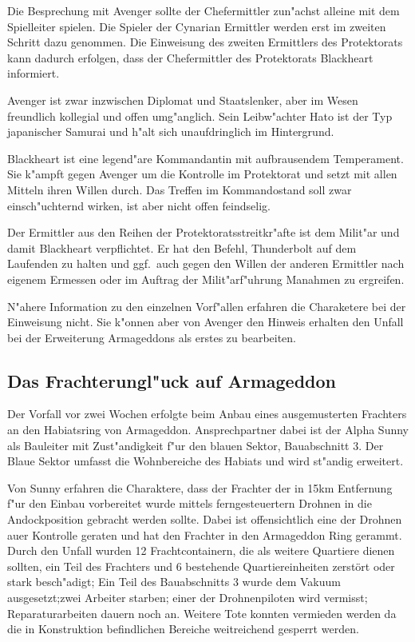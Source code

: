 \begin{remarks}
	Die Besprechung mit Avenger sollte der Chefermittler zun"achst alleine mit dem Spielleiter spielen. Die Spieler der Cynarian Ermittler werden erst im zweiten Schritt dazu genommen. Die Einweisung des zweiten Ermittlers des Protektorats kann dadurch erfolgen, dass der Chefermittler des Protektorats Blackheart informiert.
	
	Avenger ist zwar inzwischen Diplomat und Staatslenker, aber im Wesen freundlich kollegial und offen umg"anglich. Sein Leibw"achter Hato ist der Typ japanischer Samurai und h"alt sich unaufdringlich im Hintergrund.
	
	Blackheart ist eine legend"are Kommandantin mit aufbrausendem Temperament. Sie k"ampft gegen Avenger um die Kontrolle im Protektorat und setzt mit allen Mitteln ihren Willen durch. Das Treffen im Kommandostand soll zwar einsch"uchternd wirken, ist aber nicht offen feindselig.
	
	Der Ermittler aus den Reihen der Protektoratsstreitkr"afte ist dem Milit"ar und damit Blackheart verpflichtet. Er hat den Befehl, Thunderbolt auf dem Laufenden zu halten und ggf.~auch gegen den Willen der anderen Ermittler nach eigenem Ermessen oder im Auftrag der Milit"arf"uhrung Ma\3nahmen zu ergreifen.
	
	N"ahere Information zu den einzelnen Vorf"allen erfahren die Charaketere bei der Einweisung nicht. Sie k"onnen aber von Avenger den Hinweis erhalten den Unfall bei der Erweiterung Armageddons als erstes zu bearbeiten.
\end{remarks}

\subsection{Das Frachterungl"uck auf Armageddon}

Der Vorfall vor zwei Wochen erfolgte beim Anbau eines ausgemusterten Frachters an den Habiatsring von Armageddon. Ansprechpartner dabei ist der Alpha Sunny als Bauleiter mit Zust"andigkeit f"ur den blauen Sektor, Bauabschnitt 3. Der Blaue Sektor umfasst die Wohnbereiche des Habiats und wird st"andig erweitert.

Von Sunny erfahren die Charaktere, dass der Frachter der in 15km Entfernung f"ur den Einbau vorbereitet wurde mittels ferngesteuertern Drohnen in die Andockposition gebracht werden sollte. Dabei ist offensichtlich eine der Drohnen au\3er Kontrolle geraten und hat den Frachter in den Armageddon Ring gerammt. Durch den Unfall wurden 12 Frachtcontainern, die als weitere Quartiere dienen sollten, ein Teil des Frachters und 6 bestehende Quartiereinheiten zerstört oder stark besch"adigt; Ein Teil des Bauabschnitts 3 wurde dem Vakuum ausgesetzt;zwei Arbeiter starben; einer der Drohnenpiloten wird vermisst; Reparaturarbeiten dauern noch an. Weitere Tote konnten vermieden werden da die in Konstruktion befindlichen Bereiche weitreichend gesperrt werden.

